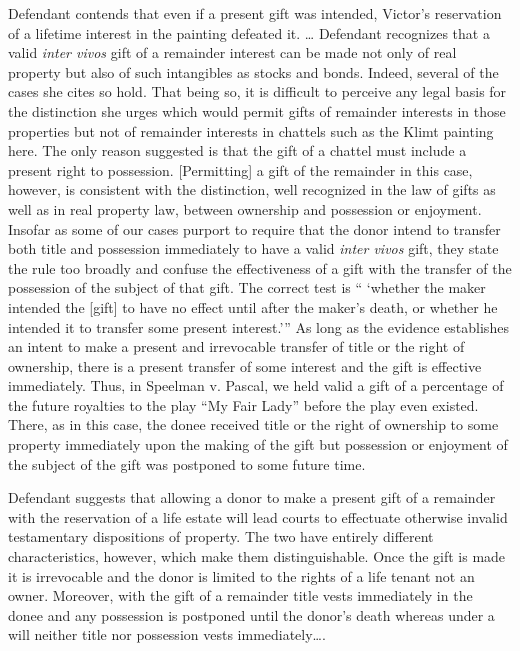 Defendant contends that even if a present gift was intended, Victor's
reservation of a lifetime interest in the painting defeated it. \dots{}
Defendant recognizes that a valid \textit{inter vivos} gift of a remainder
interest can be made not only of real property but also of such intangibles as
stocks and bonds. Indeed, several of the cases she cites so hold. That being
so, it is difficult to perceive any legal basis for the distinction she urges
which would permit gifts of remainder interests in those properties but not of
remainder interests in chattels such as the Klimt painting here. The only
reason suggested is that the gift of a chattel must include a present right to
possession. [Permitting] a gift of the remainder in this case, however, is
consistent with the distinction, well recognized in the law of gifts as well as
in real property law, between ownership and possession or enjoyment. Insofar as
some of our cases purport to require that the donor intend to transfer both
title and possession immediately to have a valid \textit{inter vivos} gift,
they state the rule too broadly and confuse the effectiveness of a gift with
the transfer of the possession of the subject of that gift. The correct test is
`` `whether the maker intended the [gift] to have no effect until after the
maker's death, or whether he intended it to transfer some present
interest.'{}'' As long as the evidence establishes an intent to make a present
and irrevocable transfer of title or the right of ownership, there is a present
transfer of some interest and the gift is effective immediately. Thus, in
Speelman v. Pascal, we held valid a gift of a percentage of the future
royalties to the play ``My Fair Lady'' before the play even existed. There, as
in this case, the donee received title or the right of ownership to some
property immediately upon the making of the gift but possession or enjoyment of
the subject of the gift was postponed to some future time.

 Defendant suggests that allowing a donor to make a present gift of a remainder 
with the reservation of a life estate will lead courts to effectuate otherwise
invalid testamentary dispositions of property. The two have entirely different
characteristics, however, which make them distinguishable. Once the gift is
made it is irrevocable and the donor is limited to the rights of a life tenant
not an owner. Moreover, with the gift of a remainder title vests immediately in
the donee and any possession is postponed until the donor's death whereas under
a will neither title nor possession vests immediately\dots. 

